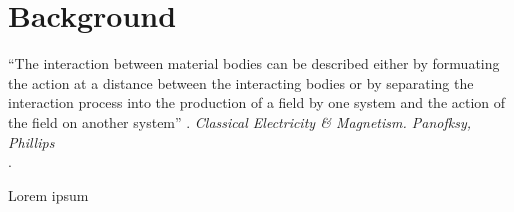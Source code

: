 \chapter{Background}
\begin{center}
  \begin{minipage}{0.75\textwidth}
    \begin{small}
      “The interaction between material bodies can be described either by formuating the action at a distance between the interacting bodies or by separating the interaction process into the production of a field by one system and the action of the field on another system” .
      \emph{Classical Electricity \& Magnetism. Panofksy, Phillips}\\.
    \end{small}
  \end{minipage}
  \vspace{0.5cm}
\end{center}

\noindent Lorem ipsum





